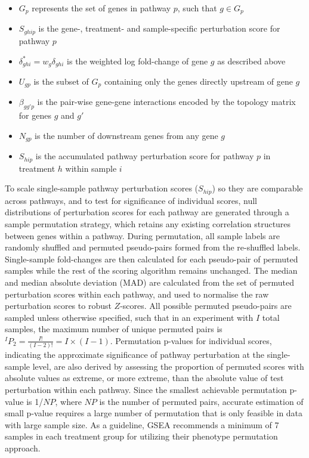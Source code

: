 \documentclass[9pt,a4paper,]{extarticle}
\begin{document}
\begin{itemize}
\item
  \(G_p\) represents the set of genes in pathway \(p\), such that \(g \in G_p\)
\item
  \(S_{ghip}\) is the gene-, treatment- and sample-specific perturbation score for pathway \(p\)
\item
  \(\delta_{ghi}^* = w_g\delta_{ghi}\) is the weighted log fold-change of gene \(g\) as described above
\item
  \(U_{gp}\) is the subset of \(G_p\) containing only the genes directly upstream of gene \(g\)
\item
  \(\beta_{gg'p}\) is the pair-wise gene-gene interactions\citep{Tarca2009} encoded by the topology matrix for genes \(g\) and \(g'\)
\item
  \(N_{gp}\) is the number of downstream genes from any gene \(g\)
\item
  \(S_{hip}\) is the accumulated pathway perturbation score for pathway \(p\) in treatment \(h\) within sample \(i\)
\end{itemize}

To scale single-sample pathway perturbation scores (\(S_{hip}\)) so they are comparable across pathways, and to test for significance of individual scores, null distributions of perturbation scores for each pathway are generated through a sample permutation strategy, which retains any existing correlation structures between genes within a pathway.
During permutation, all sample labels are randomly shuffled and permuted pseudo-pairs formed from the re-shuffled labels.
Single-sample fold-changes are then calculated for each pseudo-pair of permuted samples while the rest of the scoring algorithm remains unchanged.
The median and median absolute deviation (MAD) are calculated from the set of permuted perturbation scores within each pathway, and used to normalise the raw perturbation scores to robust \(Z\)-scores.
All possible permuted pseudo-pairs are sampled unless otherwise specified, such that in an experiment with \(I\) total samples, the maximum number of unique permuted pairs is \({}^IP_2 = \frac{{I!}}{{(I-2)!}} = I \times (I-1)\).
Permutation p-values for individual scores, indicating the approximate significance of pathway perturbation at the single-sample level, are also derived by assessing the proportion of permuted scores with absolute values as extreme, or more extreme, than the absolute value of test perturbation within each pathway\citep{Theo2009}.
Since the smallest achievable permutation p-value is 1/\(NP\), where \(NP\) is the number of permuted pairs, accurate estimation of small p-value requires a large number of permutation that is only feasible in data with large sample size.
As a guideline, GSEA recommends a minimum of 7 samples in each treatment group for utilizing their phenotype permutation approach\citep{GSEAUserGuide}.
\end{document}
